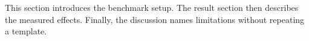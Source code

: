\documentclass{article}
\begin{document}
This section introduces the benchmark setup.
The result section then describes the measured effects.
Finally, the discussion names limitations without repeating a template.
\end{document}
